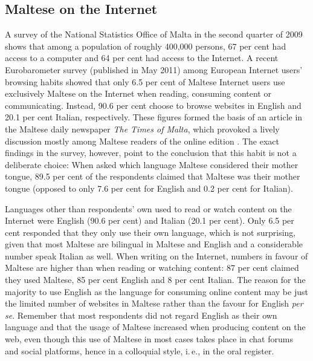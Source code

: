 \begin{multicols}{2}
\subsection{Maltese on the Internet}

A survey of the National Statistics Office of Malta in the second quarter of 2009 \cite{NSO2} shows that among a population of roughly 400,000 persons, 67 per cent had access to a computer and 64 per cent had access to the Internet. A recent Eurobarometer survey (published in May 2011) \cite{Eurobarometer1} among European Internet users' browsing habits showed that only 6.5 per cent of Maltese Internet users use exclusively Maltese on the Internet when reading, consuming content or communicating. Instead, 90.6 per cent choose to browse websites in English and 20.1 per cent Italian, respectively. These figures formed the basis of an article in the Maltese daily newspaper \emph{The Times of Malta}, which provoked a lively discussion mostly among Maltese readers of the online edition \cite{TimesOfMalta1}. 
The exact findings in the survey, however, point to the conclusion that this habit is not a deliberate choice: When asked which language Maltese considered their mother tongue, 89.5 per cent of the respondents claimed that Maltese was their mother tongue (opposed to only 7.6 per cent for English and 0.2 per cent for Italian). 

Languages other than respondents' own used to read or watch content on the Internet were English (90.6 per cent) and Italian (20.1 per cent). Only 6.5 per cent responded that they only use their own language, which is not surprising, given that most Maltese are bilingual in Maltese and English and a considerable number speak Italian as well.
When writing on the Internet, numbers in favour of Maltese are higher than when reading or watching content: 87 per cent claimed they used Maltese, 85 per cent English and 8 per cent Italian. 
The reason for the majority to use English as the language for consuming online content may be just the limited number of websites in Maltese rather than the favour for English \emph{per se}. Remember that most respondents did not regard English as their own language and that the usage of Maltese increased when producing content on the web, even though this use of Maltese in most cases takes place in chat forums and social platforms, hence in a colloquial style, i.\,e., in the oral register. 


\end{multicols}
